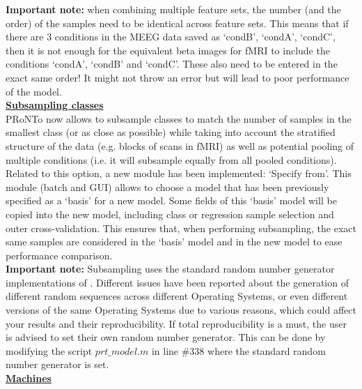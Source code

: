 \textbf{Important note:} when combining multiple feature sets, the number (and the order) of the samples need to be identical across feature sets. This means that if there are 3 conditions in the MEEG data saved as `condB', `condA', `condC', then it is not enough for the equivalent beta images for fMRI to include the conditions `condA', `condB' and `condC'. These also need to be entered in the exact same order! It might not throw an error but will lead to poor performance of the model.
\\

\noindent \underline{\textbf{Subsampling classes}}
\\

PRoNTo now allows to subsample classes to match the number of samples in the smallest class (or as close as possible) while taking into account the stratified structure of the data (e.g. blocks of scans in fMRI) as well as potential pooling of multiple conditions (i.e. it will subsample equally from all pooled conditions). Related to this option, a new module has been implemented: `Specify from'. This module (batch and GUI) allows to choose a model that has been previously specified as a `basis' for a new model. Some fields of this `basis' model will be copied into the new model, including class or regression sample selection and outer cross-validation. This ensures that, when performing subsampling, the exact same samples are considered in the `basis' model and in the new model to ease performance comparison.
\\

\textbf{Important note:} Subsampling uses the standard random number generator implementations of \matlab. Different issues have been reported about the generation of different random sequences across different Operating Systems, or even different versions of the same Operating Systems due to various reasons, which could affect your results and their reproducibility. If total reproducibility is a must, the user is advised to set their own random number generator. This can be done by modifying the script $prt\_model.m$ in line \#338 where the standard random number generator is set.
\\[0.4cm]

\noindent \underline{\textbf{Machines}}

